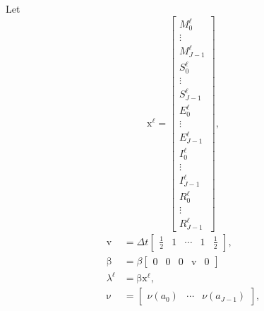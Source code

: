 \documentclass{jpmarticle}
\renewcommand{\vec}[1]{\boldsymbol{\mathrm{#1}}}
\begin{document}
Let
\begin{equation}
  \vec{x}^{\ell} =
  \begin{bmatrix}
    M_0^{\ell} \\ \vdots \\ M_{J - 1}^{\ell} \\
    S_0^{\ell} \\ \vdots \\ S_{J - 1}^{\ell} \\
    E_0^{\ell} \\ \vdots \\ E_{J - 1}^{\ell} \\
    I_0^{\ell} \\ \vdots \\ I_{J - 1}^{\ell} \\
    R_0^{\ell} \\ \vdots \\ R_{J - 1}^{\ell}
  \end{bmatrix},
\end{equation}
\begin{equation}
  \begin{split}
    \vec{v} &=
    \Delta t
    \begin{bmatrix}
      \frac{1}{2} & 1 & \cdots & 1 & \frac{1}{2}
    \end{bmatrix},
    \\
    \vec{\beta} &=
    \beta
    \begin{bmatrix}
      \vec{0} & \vec{0} & \vec{0} & \vec{v} & \vec{0}
    \end{bmatrix}
    \\
    \lambda^{\ell} &=
    \vec{\beta} \vec{x}^{\ell},
    \\
    \vec{\nu} &=
    \begin{bmatrix}
      \nu(a_0) & \cdots & \nu(a_{J - 1})
    \end{bmatrix},
  \end{split}
\end{equation}
\end{document}

